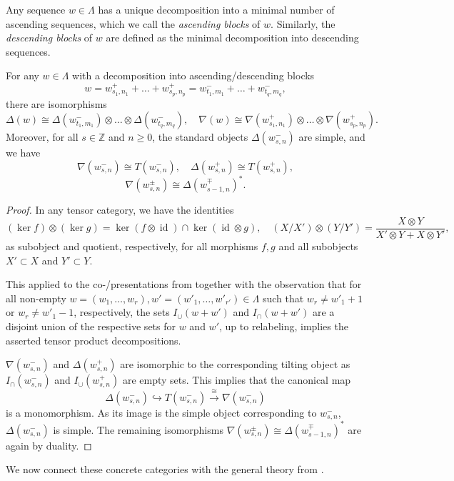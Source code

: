 \documentclass[11pt,oneside]{amsart}
\theoremstyle{definition}
\theoremstyle{remark}
\newcommand\ZZ{\mathbb Z}
\newcommand\id{\operatorname{id}}
\renewcommand\o\otimes
\renewcommand\:\colon
\begin{document}
Any sequence $w\in\Lambda$ has a unique decomposition into a minimal number of ascending sequences, which we call the \emph{ascending blocks} of $w$. Similarly, the \emph{descending blocks} of $w$ are defined as the minimal decomposition into descending sequences.

\begin{proposition} \label{prop:decomp}
For any $w\in\Lambda$ with a decomposition into ascending/descending blocks
$$
w = w^+_{s_1,n_1} + \dots + w^+_{s_p,n_p}
= w^-_{t_1,m_1} + \dots + w^-_{t_q,m_q} ,
$$
there are isomorphisms
$$
\Delta(w) \cong \Delta(w^-_{t_1,m_1}) \o\dots\o \Delta(w^-_{t_q,m_q}) , \quad
\nabla(w) \cong \nabla(w^+_{s_1,n_1}) \o\dots\o \nabla(w^+_{s_p,n_p}) .
$$
Moreover, for all $s\in\ZZ$ and $n\ge0$, the standard objects $\Delta(w^-_{s,n})$ are simple, and we have
$$
\nabla(w^-_{s,n}) \cong T(w^-_{s,n}) ,\quad \Delta(w^+_{s,n}) \cong T(w^+_{s,n}) ,
$$
$$
\nabla(w^\pm_{s,n}) \cong \Delta(w^\mp_{s-1,n})^* .
$$
\end{proposition}

\begin{proof} In any tensor category, we have the identities
$$
(\ker f)\o(\ker g) = \ker (f\o\id) \cap \ker (\id\o g) ,\quad
(X / X')\o (Y / Y') =
\frac{X\o Y}{X'\o Y + X\o Y'} ,
$$
as subobject and quotient, respectively, for all morphisms $f,g$ and all subobjects $X'\subset X$ and $Y'\subset Y$.

This applied to the co-/presentations from  together with the observation that for all non-empty $w=(w_1,\dots,w_r),w'=(w'_1,\dots,w'_{r'})\in\Lambda$ such that $w_r\neq w'_1+1$ or $w_r\neq w'_1-1$, respectively, the sets $I_\cup(w+w')$ and $I_\cap(w+w')$ are a disjoint union of the respective sets for $w$ and $w'$, up to relabeling,
 implies the asserted tensor product decompositions.

$\nabla(w^-_{s,n})$ and $\Delta(w^+_{s,n})$ are isomorphic to the corresponding tilting object as $I_\cap(w^-_{s,n})$ and $I_\cup(w^+_{s,n})$ are empty sets.
This implies that the canonical map $$
\Delta(w^-_{s,n})\hookrightarrow T(w^-_{s,n})\xrightarrow{\cong} \nabla(w^-_{s,n})
$$ is a monomorphism. As its image is the simple object corresponding to $w^-_{s,n}$, $\Delta(w^-_{s,n})$ is simple.
The remaining isomorphisms $\nabla(w^\pm_{s,n})\cong \Delta(w^\mp_{s-1,n})^*$ are again by duality.
\end{proof}

We now connect these concrete categories with the general theory from .
\end{document}
